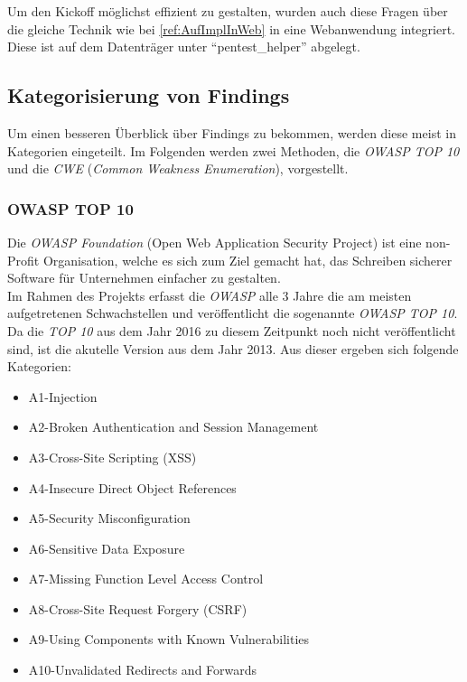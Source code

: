 		Um den Kickoff möglichst effizient zu gestalten, wurden auch diese Fragen über die gleiche Technik wie bei \ref{ref:AufImplInWeb} in eine Webanwendung integriert. Diese ist auf dem Datenträger unter "`pentest\_helper"' abgelegt.
			
	\subsection{Kategorisierung von Findings}
	Um einen besseren Überblick über Findings zu bekommen, werden diese meist in Kategorien eingeteilt. Im Folgenden werden zwei Methoden, die \textit{OWASP TOP 10} und die \textit{CWE} (\textit{Common Weakness Enumeration}), vorgestellt.
	
		\subsubsection{OWASP TOP 10}
		Die \textit{OWASP Foundation} (Open Web Application Security Project) ist eine non-Profit Organisation, welche es sich zum Ziel gemacht hat, das Schreiben sicherer Software für Unternehmen einfacher zu gestalten.\\
		
		Im Rahmen des Projekts erfasst die \textit{OWASP} alle 3 Jahre die am meisten aufgetretenen Schwachstellen und veröffentlicht die sogenannte \textit{OWASP TOP 10}. Da die \textit{TOP 10} aus dem Jahr 2016 zu diesem Zeitpunkt noch nicht veröffentlicht sind, ist die akutelle Version aus dem Jahr 2013. Aus dieser ergeben sich folgende Kategorien\cite{OWASPTOP10}:
		\begin{itemize}
			\item A1-Injection
			\item A2-Broken Authentication and Session Management
			\item A3-Cross-Site Scripting (XSS)
			\item A4-Insecure Direct Object References
			\item A5-Security Misconfiguration
			\item A6-Sensitive Data Exposure
			\item A7-Missing Function Level Access Control
			\item A8-Cross-Site Request Forgery (CSRF)
			\item A9-Using Components with Known Vulnerabilities 
			\item A10-Unvalidated Redirects and Forwards
		\end{itemize}
		
